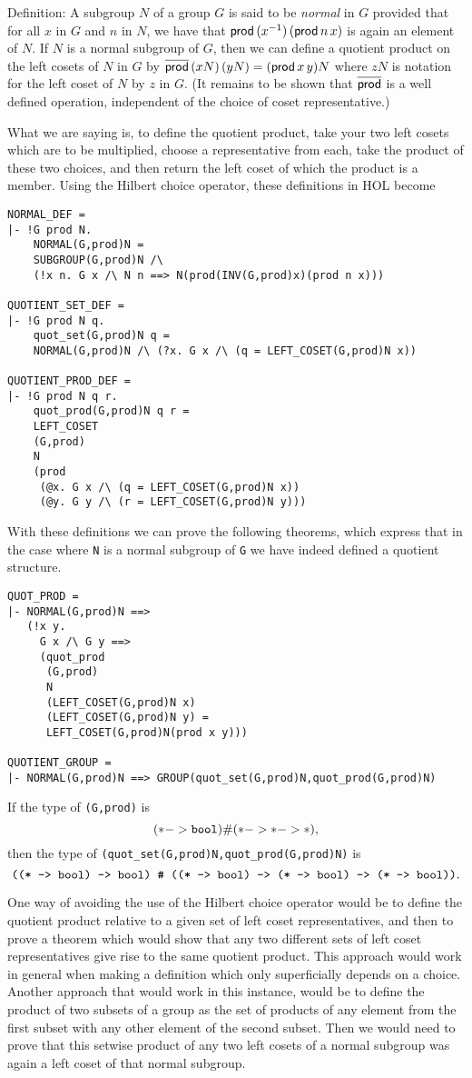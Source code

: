 \begin{display}{Definition:}
A subgroup $N$ of a group $G$ is said to be {\it normal} in $G$
provided that for all $x$ in $G$ and $n$ in $N$, we have that 
${\sf prod}\,(x^{-1})\,({\sf prod}\,n\,x)$ is again an element of $N$.  If
$N$ is a normal subgroup of $G$, then we can define a quotient product
on the left cosets of $N$ in $G$ by
$\overline{\sf prod}\,(xN)\,(yN)=({\sf prod}\,x\,y)N$ where $zN$ is notation
for the left coset of $N$ by $z$ in $G$.  (It remains to be shown that
$\overline{\sf prod}$ is a well defined operation, independent of the
choice of coset representative.)
\end{display}

What we are saying is, to define the quotient product, take your two
left cosets which are to be multiplied, choose a representative from
each, take the product of these two choices, and then return the left
coset of which the product is a member.  Using the Hilbert choice
operator, these definitions in HOL become
\begin{verbatim}
NORMAL_DEF =
|- !G prod N.
    NORMAL(G,prod)N =
    SUBGROUP(G,prod)N /\
    (!x n. G x /\ N n ==> N(prod(INV(G,prod)x)(prod n x)))

QUOTIENT_SET_DEF =
|- !G prod N q.
    quot_set(G,prod)N q =
    NORMAL(G,prod)N /\ (?x. G x /\ (q = LEFT_COSET(G,prod)N x))

QUOTIENT_PROD_DEF =
|- !G prod N q r.
    quot_prod(G,prod)N q r =
    LEFT_COSET
    (G,prod)
    N
    (prod
     (@x. G x /\ (q = LEFT_COSET(G,prod)N x))
     (@y. G y /\ (r = LEFT_COSET(G,prod)N y)))
\end{verbatim}
With these definitions we can prove the following theorems, which
express that in the case where {\tt N} is a normal subgroup of {\tt G}
we have indeed defined a quotient structure.
\begin{verbatim}
QUOT_PROD =
|- NORMAL(G,prod)N ==>
   (!x y.
     G x /\ G y ==>
     (quot_prod
      (G,prod)
      N
      (LEFT_COSET(G,prod)N x)
      (LEFT_COSET(G,prod)N y) =
      LEFT_COSET(G,prod)N(prod x y)))

QUOTIENT_GROUP =
|- NORMAL(G,prod)N ==> GROUP(quot_set(G,prod)N,quot_prod(G,prod)N)
\end{verbatim}
If the type of {\tt (G,prod)} is 
$${\tt (* -> bool) {\#} (* -> * -> *)},$$
then the type of {\tt (quot\_set(G,prod)N,quot\_prod(G,prod)N)} is
$$\mbox{\tt ((* -> bool) -> bool) {\#}
 ((* -> bool) -> (* -> bool) -> (* -> bool))}.$$

One way of avoiding the use of the Hilbert choice operator would be to
define the quotient product relative to a given set of left coset
representatives, and then to prove a theorem which would show that any
two different sets of left coset representatives give rise to the same
quotient product.  This approach would work in general when making a
definition which only superficially depends on a choice.  Another
approach that would work in this instance, would be to define the
product of two subsets of a group as the set of products of any
element from the first subset with any other element of the second
subset.  Then we would need to prove that this setwise product of any
two left cosets of a normal subgroup was again a left coset of that
normal subgroup.

